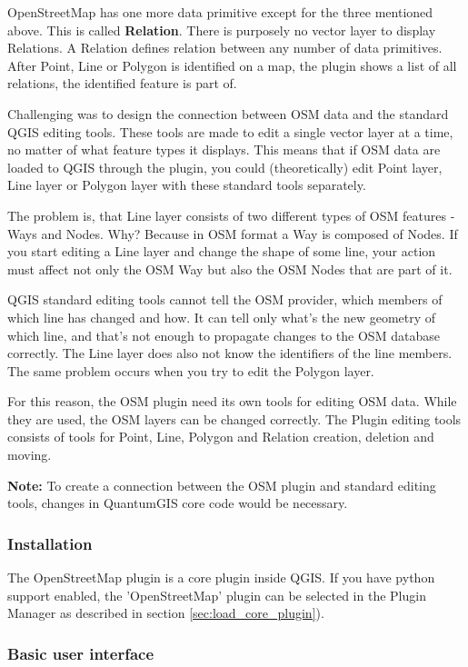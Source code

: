 OpenStreetMap has one more data primitive except for the three mentioned
above. This is called \textbf{Relation}. There is purposely no vector layer 
to display Relations. A Relation defines relation between any number of 
data primitives. After Point, Line or Polygon is identified on a map, 
the plugin shows a list of all relations, the identified feature is part of.

Challenging was to design the connection between OSM data and the 
standard QGIS editing tools. These tools are made to edit a single vector 
layer at a time, no matter of what feature types it displays. This means 
that if OSM data are loaded to QGIS through the plugin, you could 
(theoretically) edit Point layer, Line layer or Polygon layer with these 
standard tools separately.

The problem is, that Line layer consists of two different types of OSM
features - Ways and Nodes. Why? Because in OSM format a Way is composed of 
Nodes. If you start editing a Line layer and change the shape of some line, 
your action must affect not only the OSM Way but also the OSM Nodes that 
are part of it.

QGIS standard editing tools cannot tell the OSM provider, which members
of which line has changed and how. It can tell only what's the new geometry
of which line, and that's not enough to propagate changes to the OSM database
correctly. The Line layer does also not know the identifiers of the line 
members. The same problem occurs when you try to edit the Polygon layer.

For this reason, the OSM plugin need its own tools for editing OSM data. 
While they are used, the OSM layers can be changed correctly. The Plugin 
editing tools consists of tools for Point, Line, Polygon and 
Relation creation, deletion and moving.

\textbf{Note:} To create a connection between the OSM plugin and standard 
editing tools, changes in QuantumGIS core code would be necessary.

\subsubsection{Installation}

The OpenStreetMap plugin is a core plugin inside QGIS. If you have python 
support enabled, the 'OpenStreetMap' plugin can be selected in the Plugin 
Manager as described in section \ref{sec:load_core_plugin}). 

\subsubsection{Basic user interface}

